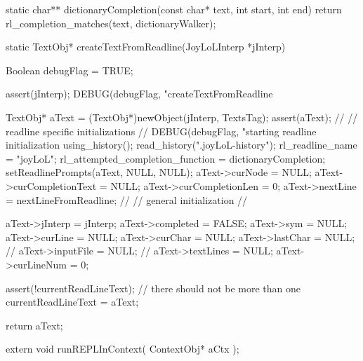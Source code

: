 static char** dictionaryCompletion(const char* text, int start, int end) {
 return rl_completion_matches(text, dictionaryWalker);
}
\stopCCode

\startCCode
static TextObj* createTextFromReadline(JoyLoLInterp *jInterp) {
  Boolean debugFlag = TRUE;
  
  assert(jInterp);
  DEBUG(debugFlag, "createTextFromReadline %
  
  TextObj* aText = (TextObj*)newObject(jInterp, TextsTag);
  assert(aText);
  //
  // readline specific initializations
  //
  DEBUG(debugFlag, "starting readline initialization %
  using_history();
  read_history(".joyLoL-history");
  rl_readline_name = "joyLoL";
  rl_attempted_completion_function = dictionaryCompletion;
  setReadlinePrompts(aText, NULL, NULL);
  aText->curNode = NULL;
  aText->curCompletionText = NULL;
  aText->curCompletionLen  = 0;
  aText->nextLine = nextLineFromReadline;
  //
  // general initialization
  //

  aText->jInterp    = jInterp;
  aText->completed  = FALSE;
  aText->sym        = NULL;
  aText->curLine    = NULL;
  aText->curChar    = NULL;
  aText->lastChar   = NULL;
  //
  aText->inputFile = NULL;
  //
  aText->textLines  = NULL;
  aText->curLineNum = 0;

  assert(!currentReadLineText); // there should not be more than one
  currentReadLineText = aText;

  return aText;
}
\stopCCode

\startCHeader
extern void runREPLInContext(
  ContextObj* aCtx
);
\stopCHeader

